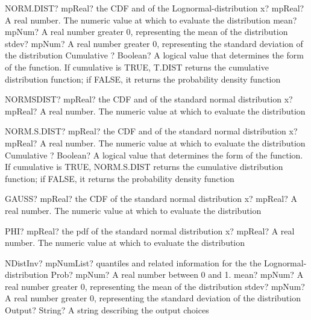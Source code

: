 \documentclass[12pt,a4paper,openany]{book}
\begin{document}
\begin{mpFunctionsExtract}
\mpWorksheetFunctionFourNotImplemented
{NORM.DIST? mpReal? the CDF and of the Lognormal-distribution}
{x? mpReal? A real number. The numeric value at which to evaluate the distribution}
{mean? mpNum? A real number greater 0, representing the mean of the distribution}
{stdev? mpNum? A real number greater 0, representing the standard deviation of the distribution}
{Cumulative ? Boolean? A logical value that determines the form of the function. If cumulative is TRUE, T.DIST returns the cumulative distribution function; if FALSE, it returns the probability density function}
\end{mpFunctionsExtract}

\begin{mpFunctionsExtract}
\mpWorksheetFunctionOneNotImplemented
{NORMSDIST? mpReal? the CDF and of the  standard normal distribution}
{x? mpReal? A real number. The numeric value at which to evaluate the distribution}
\end{mpFunctionsExtract}

\begin{mpFunctionsExtract}
\mpWorksheetFunctionTwoNotImplemented
{NORM.S.DIST? mpReal? the CDF and of the  standard normal distribution}
{x? mpReal? A real number. The numeric value at which to evaluate the distribution}
{Cumulative ? Boolean? A logical value that determines the form of the function. If cumulative is TRUE, NORM.S.DIST returns the cumulative distribution function; if FALSE, it returns the probability density function}
\end{mpFunctionsExtract}

\begin{mpFunctionsExtract}
\mpWorksheetFunctionOneNotImplemented
{GAUSS? mpReal? the CDF of the  standard normal distribution}
{x? mpReal? A real number. The numeric value at which to evaluate the distribution}
\end{mpFunctionsExtract}

\begin{mpFunctionsExtract}
\mpWorksheetFunctionOneNotImplemented
{PHI? mpReal? the pdf of the  standard normal distribution}
{x? mpReal? A real number. The numeric value at which to evaluate the distribution}
\end{mpFunctionsExtract}

\begin{mpFunctionsExtract}
\mpFunctionFourNotImplemented
{NDistInv? mpNumList? quantiles and related information for the the Lognormal-distribution}
{Prob? mpNum? A real number between 0 and 1.}
{mean? mpNum? A real number greater 0, representing the mean of the distribution}
{stdev? mpNum? A real number greater 0, representing the standard deviation of the distribution}
{Output? String? A string describing the output choices}
\end{mpFunctionsExtract}
\end{document}
